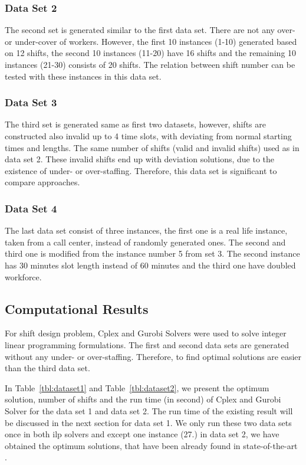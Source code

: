 \subsubsection{Data Set 2}
The second set is generated similar to the first data set. There are not any over- or under-cover of workers. However, the first 10 instances (1-10) generated based on 12 shifts, the second 10 instances (11-20) have 16 shifts and the remaining 10 instances (21-30) consists of 20 shifts. The relation between shift number can be tested with these instances in this data set. 

\subsubsection{Data Set 3}
The third set is generated same as first two datasets, however, shifts are constructed also invalid up to 4 time slots, with deviating from normal starting times and lengths. The same number of shifts (valid and invalid shifts) used as in data set 2. These invalid shifts end up with deviation solutions, due to the existence of under- or over-staffing. Therefore, this data set is significant to compare approaches.

\subsubsection{Data Set 4}
The last data set consist of three instances, the first one is a real life instance, taken from a call center, instead of randomly generated ones. The second and third one is modified from the instance number 5 from set 3. The second instance has 30 minutes slot length instead of 60 minutes and the third one have doubled workforce.

\subsection{Computational Results }

For shift design problem, Cplex and Gurobi Solvers were used to solve integer linear programming formulations. The first and second data sets are generated without any under- or over-staffing. Therefore, to find optimal solutions are easier than the third data set. 

In Table~\ref{tbl:dataset1} and Table~\ref{tbl:dataset2}, we present the optimum solution, number of shifts and the run time (in second) of Cplex and Gurobi Solver for the data set 1 and data set 2. The run time of the existing result will be discussed in the next section for data set 1. We only run these two data sets once in both ilp solvers and except one instance (27.) in data set 2, we have obtained the optimum solutions, that have been already found in state-of-the-art \cite{li:2007:gaspero} \cite{li:2010:abseher}. 


